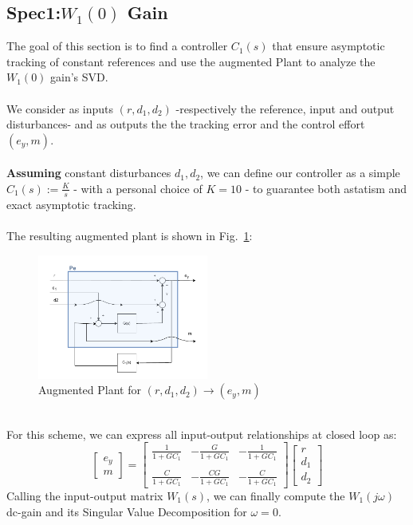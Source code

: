 \documentclass[a4paper, 12pt]{article}
\def\FigureTwo{\centering\includegraphics[width=0.5\textwidth]{Figures/fig02.pdf}}
\begin{document}
\subsection{Spec1:$W_{1}(0)$ Gain}
The goal of this section is to find a controller $C_1(s)$ that ensure asymptotic tracking of constant references and use the augmented Plant to analyze the $W_{1}(0)$ gain's SVD. 
\\\\
We consider as inputs $(r, d_1, d_2)$ -respectively the reference, input and output disturbances- and as outputs the the tracking error and the control effort $(e_y, m)$.
\\\\
\textbf{Assuming} constant disturbances $d_1, d_2$, we can define our controller as a simple $C_1(s):= \frac{K}{s}$ - with a personal choice of $K = 10$ - to guarantee both astatism and exact asymptotic tracking.
\\\\
The resulting augmented plant is shown in Fig.~\ref{fig:fig02}:  
\begin{figure}[h!]
    \FigureTwo
    \caption{Augmented Plant for $(r,d_1,d_2)\longrightarrow(e_y,m)$}
    \label{fig:fig02}
\end{figure}
\\For this scheme, we can express all input-output relationships at closed loop as:
\begin{equation}
\begin{bmatrix}
e_y \\
m
\end{bmatrix}
=
\begin{bmatrix}
\frac{1}{1+GC_1} & -\frac{G}{1+GC_1} & -\frac{1}{1+GC_1} \\
\\
\frac{C}{1+GC_1} & -\frac{CG}{1+GC_1} & -\frac{C}{1+GC_1}
\end{bmatrix}
\begin{bmatrix}
r \\
d_1 \\
d_2
\end{bmatrix}
\label{eq:AugmentedPlant1}
\end{equation}
Calling the input-output matrix $W_1(s)$, we can finally compute the $W_1(j\omega)$ dc-gain and its Singular Value Decomposition for $\omega = 0$.
\end{document}
